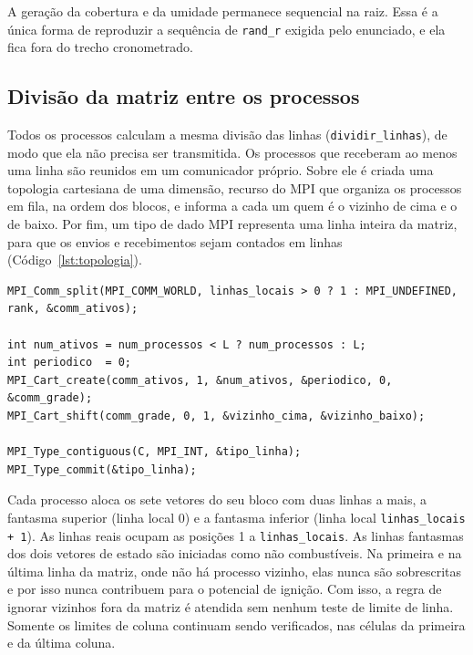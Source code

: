 \documentclass[11pt,a4paper]{article}
\begin{document}
A geração da cobertura e da umidade permanece sequencial na raiz. Essa é a única forma de reproduzir a sequência de \texttt{rand\_r} exigida pelo enunciado, e ela fica fora do trecho cronometrado.

\subsection{Divisão da matriz entre os processos}

Todos os processos calculam a mesma divisão das linhas (\texttt{dividir\_linhas}), de modo que ela não precisa ser transmitida. Os processos que receberam ao menos uma linha são reunidos em um comunicador próprio. Sobre ele é criada uma topologia cartesiana de uma dimensão, recurso do MPI que organiza os processos em fila, na ordem dos blocos, e informa a cada um quem é o vizinho de cima e o de baixo. Por fim, um tipo de dado MPI representa uma linha inteira da matriz, para que os envios e recebimentos sejam contados em linhas (Código~\ref{lst:topologia}).

\begin{lstlisting}[caption={Comunicador dos processos com linhas, fila de processos e tipo de linha, em \texttt{decompor\_dominio} (prefixo \texttt{dec->} dos campos omitido).},label={lst:topologia}]
MPI_Comm_split(MPI_COMM_WORLD, linhas_locais > 0 ? 1 : MPI_UNDEFINED, rank, &comm_ativos);

int num_ativos = num_processos < L ? num_processos : L;
int periodico  = 0;
MPI_Cart_create(comm_ativos, 1, &num_ativos, &periodico, 0, &comm_grade);
MPI_Cart_shift(comm_grade, 0, 1, &vizinho_cima, &vizinho_baixo);

MPI_Type_contiguous(C, MPI_INT, &tipo_linha);
MPI_Type_commit(&tipo_linha);
\end{lstlisting}

Cada processo aloca os sete vetores do seu bloco com duas linhas a mais, a fantasma superior (linha local 0) e a fantasma inferior (linha local \texttt{linhas\_locais + 1}). As linhas reais ocupam as posições 1 a \texttt{linhas\_locais}. As linhas fantasmas dos dois vetores de estado são iniciadas como não combustíveis. Na primeira e na última linha da matriz, onde não há processo vizinho, elas nunca são sobrescritas e por isso nunca contribuem para o potencial de ignição. Com isso, a regra de ignorar vizinhos fora da matriz é atendida sem nenhum teste de limite de linha. Somente os limites de coluna continuam sendo verificados, nas células da primeira e da última coluna.
\end{document}
